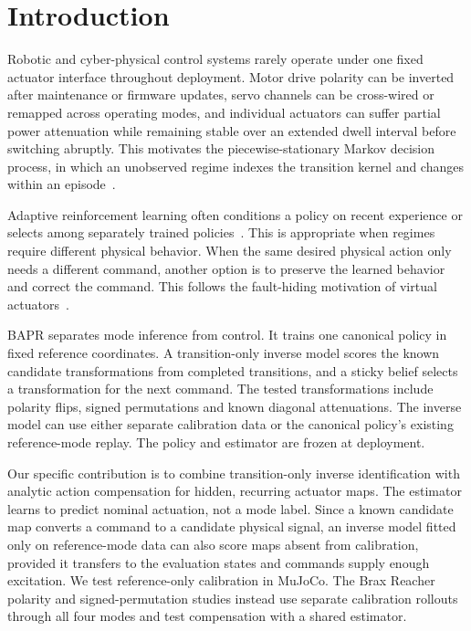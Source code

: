 \documentclass[twoside,11pt]{article}
\begin{document}
\section{Introduction}

Robotic and cyber-physical control systems rarely operate under one fixed actuator interface throughout deployment. Motor drive polarity can be inverted after maintenance or firmware updates, servo channels can be cross-wired or remapped across operating modes, and individual actuators can suffer partial power attenuation while remaining stable over an extended dwell interval before switching abruptly. This motivates the piecewise-stationary Markov decision process, in which an unobserved regime indexes the transition kernel and changes within an episode~\citep{Padakandla2020Survey,Lecarpentier2019NonStationary}.

Adaptive reinforcement learning often conditions a policy on recent experience or selects among separately trained policies~\citep{Luo2022ESCP,Rakelly2019PEARL,Zintgraf2020VariBAD,Kumar2021RMA}. This is appropriate when regimes require different physical behavior. When the same desired physical action only needs a different command, another option is to preserve the learned behavior and correct the command. This follows the fault-hiding motivation of virtual actuators~\citep{LunzeSteffen2003VirtualActuator,Seron2011VirtualActuatorBank}.

BAPR separates mode inference from control. It trains one canonical policy in fixed reference coordinates. A transition-only inverse model scores the known candidate transformations from completed transitions, and a sticky belief selects a transformation for the next command. The tested transformations include polarity flips, signed permutations and known diagonal attenuations. The inverse model can use either separate calibration data or the canonical policy's existing reference-mode replay. The policy and estimator are frozen at deployment.

Our specific contribution is to combine transition-only inverse identification with analytic action compensation for hidden, recurring actuator maps. The estimator learns to predict nominal actuation, not a mode label. Since a known candidate map converts a command to a candidate physical signal, an inverse model fitted only on reference-mode data can also score maps absent from calibration, provided it transfers to the evaluation states and commands supply enough excitation. We test reference-only calibration in MuJoCo. The Brax Reacher polarity and signed-permutation studies instead use separate calibration rollouts through all four modes and test compensation with a shared estimator.
\end{document}
